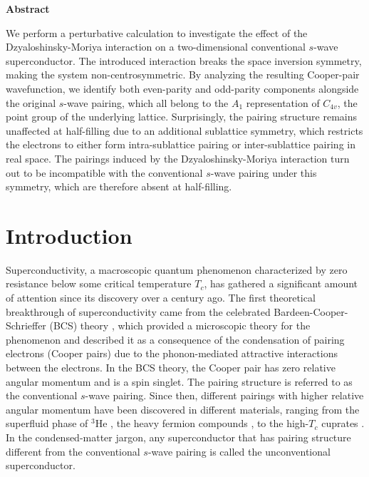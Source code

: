 \documentclass[11pt]{article}
\begin{document}

\thispagestyle{plain}
\begin{flushleft}
    \vspace{0.9cm}
    \huge \textbf{Abstract}
    \vspace{0.5cm}
\end{flushleft}
We perform a perturbative calculation to investigate the effect of the
Dzyaloshinsky-Moriya interaction on a two-dimensional conventional $s$-wave superconductor.
The introduced interaction breaks the space inversion symmetry, making the system non-centrosymmetric.
By analyzing the resulting Cooper-pair wavefunction, we identify
both even-parity and odd-parity components alongside the original $s$-wave pairing,
which all belong to the $A_1$ representation of $C_{4v}$, the point group of the underlying lattice.
Surprisingly, the pairing structure remains unaffected at half-filling due to an additional
sublattice symmetry, which restricts the electrons to either form intra-sublattice pairing
or inter-sublattice pairing in real space. The pairings induced by the
Dzyaloshinsky-Moriya interaction turn out to be incompatible with the conventional $s$-wave
pairing under this symmetry, which are therefore absent at half-filling.
\newpage

\section{Introduction}
Superconductivity, a macroscopic quantum phenomenon characterized by zero resistance
below some critical temperature $T_c$,
has gathered a significant amount of attention since its discovery
over a century ago. The first theoretical breakthrough of superconductivity came from
the celebrated Bardeen-Cooper-Schrieffer (BCS) theory \cite{BCS1957}, which provided a microscopic theory
for the phenomenon and described it as a consequence of the condensation of pairing electrons (Cooper
pairs) due to the phonon-mediated attractive interactions between the electrons.
In the BCS theory, the Cooper pair has zero relative angular momentum and is a spin singlet.
The pairing structure is referred to as the conventional $s$-wave pairing.
Since then, different pairings with higher relative angular momentum have been discovered in
different materials, ranging from the superfluid phase of $^3$He \cite{Osheroff1972,Leggett1975},
the heavy fermion
compounds \cite{Stewart1984,White2015,Yoshichika2004}, to the high-$T_c$ cuprates
\cite{Dagotto1994, Tsuei2000,Anderson2004}.
In the condensed-matter jargon, any superconductor that has pairing structure different
from the conventional $s$-wave pairing is called the unconventional superconductor.
\end{document}
